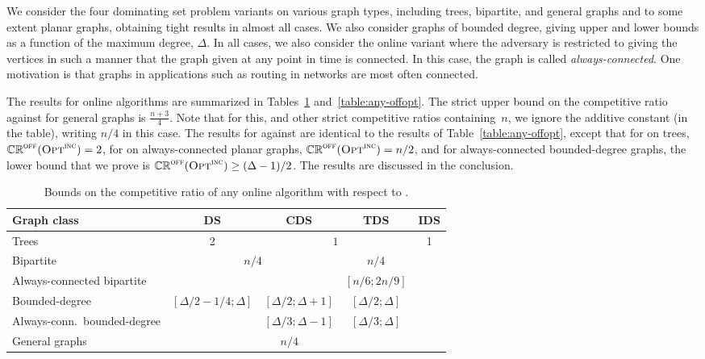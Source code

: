 We consider the four dominating set problem variants
on various graph types, including trees, bipartite, and general graphs
and to some extent planar graphs, obtaining tight results
in almost all cases.
We also consider graphs of bounded degree, giving upper and lower
bounds as a function of the maximum degree, $\Delta$.
In all cases, we also consider the online variant where the
adversary is restricted to giving the vertices in such a manner
that the graph given at any point in time is connected.
In this case, the graph is called {\em always-connected}.
One motivation is that graphs in applications such as routing in 
networks are most often connected.



The results for online algorithms are summarized in 
Tables~\ref{table:any-onopt} and~\ref{table:any-offopt}. The strict upper
bound on the competitive ratio against \onopt for general graphs is
$\frac{n+3}{4}$. Note that for this, and other strict competitive
ratios containing~$n$,
we ignore the additive constant (in the table), writing $n/4$ in this case.
The results for \onopt against \offopt are identical to the results of
Table~\ref{table:any-offopt}, except that for \ds on trees,
$\mathbb{CR}^{\textsc{off}}(\operatorname{\textsc{Opt}}^\textsc{\ensuremath{\text{inc}}})=2$, for \ds on always-connected planar graphs,
$\mathbb{CR}^{\textsc{off}}(\operatorname{\textsc{Opt}}^\textsc{\ensuremath{\text{inc}}}) = n/2$, and for always-connected bounded-degree graphs, the lower bound that we prove is $\mathbb{CR}^{\textsc{off}}(\operatorname{\textsc{Opt}}^\textsc{\ensuremath{\text{inc}}}) \geq (\Delta-1)/2$.
The results are discussed in the conclusion.

\begin{table}
\begin{tabular}{|l||c|c|c|c|}
\hline
Graph class & DS & CDS & TDS & IDS \\
\hline\hline
Trees & 2 & \multicolumn{2}{c|}{$1$} & \multirow{6}{*}{1}\\ 
\hhline{|----|~|}
Bipartite & \multicolumn{2}{c|}{\multirow{2}{*}{$n/4$}} & $n/4$ & \\
\hhline{|-|~~-|~|}
Always-connected bipartite & \multicolumn{2}{c|}{} & $[n/6;2n/9]$ & \\
\hhline{|----|~|}
Bounded-degree & \multirow{2}{*}{$[\Delta/2-1/4; \Delta]$} & $[\Delta/2; \Delta+1]$ &
$[\Delta/2; \Delta]$ & \\ 
\hhline{|-|~|-|-|~|}
Always-conn.\ bounded-degree & & $[\Delta/3; \Delta -1]$ & $[\Delta/3; \Delta]$ & \\
\hhline{|-|-|-|-|~|}
General graphs & \multicolumn{3}{c|}{$n/4$}  & \\
\hline
\end{tabular}
\caption{Bounds on the competitive ratio of any online algorithm
with respect to \onopt.\label{table:any-onopt}}
\end{table}

